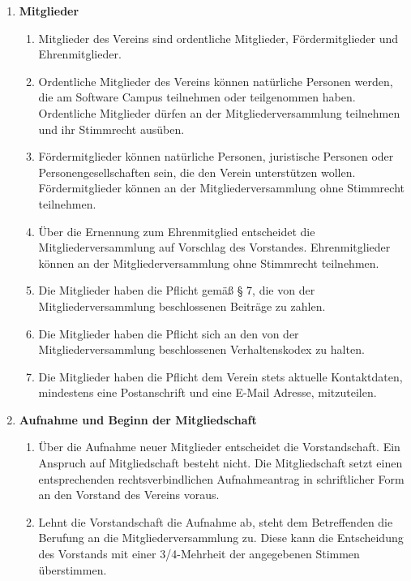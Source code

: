 \documentclass{article}
\begin{document}
\begin{enumerate}[§ 1.]
\item \textsf{\textbf{Mitglieder}}
	\begin{enumerate}[1.]
	\item Mitglieder des Vereins sind ordentliche Mitglieder, Fördermitglieder und
Ehrenmitglieder.
	\item Ordentliche Mitglieder des Vereins können natürliche Personen werden, die am
Software Campus teilnehmen oder teilgenommen haben.
Ordentliche Mitglieder
dürfen an der Mitgliederversammlung teilnehmen und ihr Stimmrecht ausüben.
	\item Fördermitglieder können natürliche Personen, juristische Personen oder
Personengesellschaften sein, die den Verein unterstützen wollen. Fördermitglieder
können an der Mitgliederversammlung ohne Stimmrecht teilnehmen.
	\item Über die Ernennung zum Ehrenmitglied entscheidet die Mitgliederversammlung auf Vorschlag des Vorstandes.
Ehrenmitglieder können an der Mitgliederversammlung ohne Stimmrecht teilnehmen.
	\item Die Mitglieder haben die Pflicht gemäß § 7, die von der Mitgliederversammlung
beschlossenen Beiträge zu zahlen.
	\item Die Mitglieder haben die Pflicht sich an den von der Mitgliederversammlung beschlossenen Verhaltenskodex zu halten.
	\item Die Mitglieder haben die Pflicht dem Verein stets aktuelle Kontaktdaten, mindestens eine Postanschrift und eine E-Mail Adresse, mitzuteilen. 
	\end{enumerate}

\item \textsf{\textbf{Aufnahme und Beginn der Mitgliedschaft}}
	\begin{enumerate}[1.]
	\item Über die Aufnahme neuer Mitglieder entscheidet die Vorstandschaft. Ein Anspruch
auf Mitgliedschaft besteht nicht. Die Mitgliedschaft setzt einen entsprechenden
rechtsverbindlichen Aufnahmeantrag in schriftlicher Form an den Vorstand des
Vereins voraus.
	\item Lehnt die Vorstandschaft die Aufnahme ab, steht dem Betreffenden die Berufung
an die Mitgliederversammlung zu. Diese kann die Entscheidung des Vorstands mit
einer 3/4-Mehrheit der angegebenen Stimmen überstimmen.
	\end{enumerate}


\end{enumerate}
\end{document}
